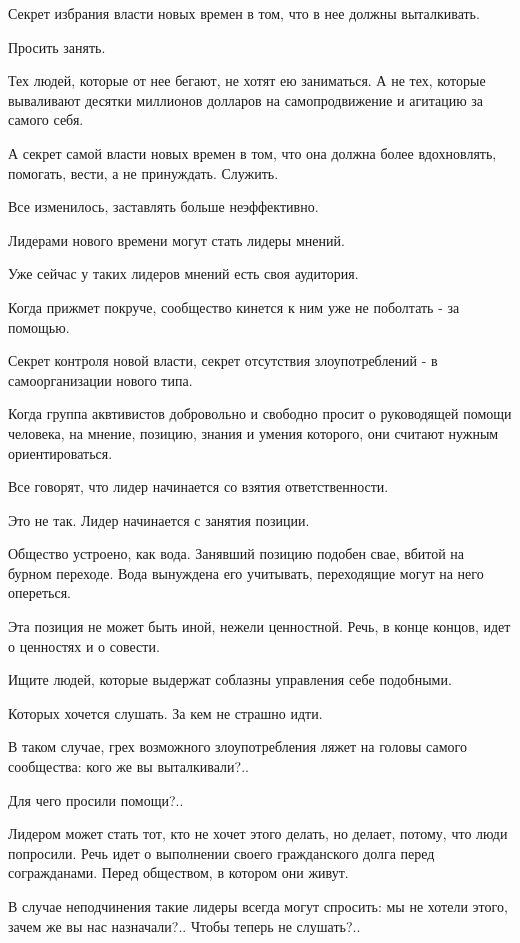 Секрет избрания власти новых времен в том, что в нее должны выталкивать. 

Просить занять. 

Тех людей, которые от нее бегают, не хотят ею заниматься. А не тех, которые
вываливают десятки миллионов долларов на самопродвижение и агитацию за самого
себя. 

А секрет самой власти новых времен в том, что она должна более вдохновлять,
помогать, вести, а не принуждать. Служить. 

Все изменилось, заставлять больше неэффективно. 

Лидерами нового времени могут стать лидеры мнений.

 Уже сейчас у таких лидеров мнений есть своя аудитория. 

Когда прижмет покруче, сообщество кинется к ним уже не поболтать - за помощью. 

Секрет контроля новой власти, секрет отсутствия злоупотреблений - в
самоорганизации нового типа. 

Когда группа аквтивистов добровольно и свободно просит о руководящей помощи
человека, на мнение, позицию, знания и умения которого, они считают нужным
ориентироваться. 

Все говорят, что лидер начинается со взятия ответственности. 

Это не так. Лидер начинается с занятия позиции. 

Общество устроено, как вода. Занявший позицию подобен свае, вбитой на бурном
переходе. Вода вынуждена его учитывать, переходящие могут на него опереться. 

Эта позиция не может быть иной, нежели ценностной. Речь, в конце концов, идет о
ценностях и о совести.  

Ищите людей, которые выдержат соблазны управления себе подобными.

Которых хочется слушать. За кем не страшно идти.

В таком случае, грех возможного злоупотребления ляжет на головы самого
сообщества: кого же вы выталкивали?.. 

Для чего просили помощи?..

Лидером может стать тот, кто не хочет этого делать, но делает, потому, что люди
попросили. Речь идет о выполнении своего гражданского долга перед согражданами.
Перед обществом, в котором они живут.

В случае неподчинения такие лидеры всегда могут спросить: мы не хотели этого,
зачем же вы нас назначали?.. Чтобы теперь не слушать?..

